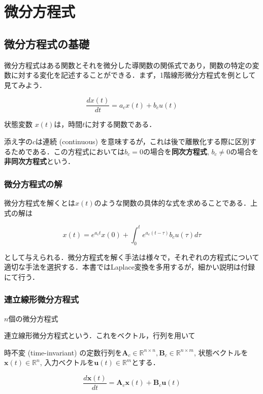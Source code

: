 \section{微分方程式}
\subsection{微分方程式の基礎}
微分方程式はある関数とそれを微分した導関数の関係式であり，関数の特定の変数に対する変化を記述することができる．まず，1階線形微分方程式を例として見てみよう．


\begin{equation}
\frac{dx(t)}{dt}=a_c x(t)+b_c u(t)
\end{equation}


状態変数 $x(t)$は，時間$t$に対する関数である．

添え字の$c$は連続 (continuous) を意味するが，これは後で離散化する際に区別するためである．この方程式においては$b_c=0$の場合を\textbf{同次方程式}, $b_c\neq 0$の場合を\textbf{非同次方程式}という．

\subsubsection{微分方程式の解}
微分方程式を解くとは$x(t)$のような関数の具体的な式を求めることである．上式の解は


\begin{equation}
x(t)=e^{a_c t}x(0)+\int_0^t e^{a_c (t-\tau)}b_c u(\tau) d\tau
\end{equation}


として与えられる．微分方程式を解く手法は様々で，それぞれの方程式について適切な手法を選択する．本書ではLaplace変換を多用するが，細かい説明は付録にて行う．

\subsubsection{連立線形微分方程式}
$n$個の微分方程式

連立線形微分方程式という．これをベクトル，行列を用いて

時不変 (time-invariant) の定数行列を$\mathbf{A}_c \in \mathbb{R}^{n\times n}, \mathbf{B}_c \in \mathbb{R}^{n\times m}$, 状態ベクトルを$\mathbf{x}(t)\in\mathbb{R}^n$, 入力ベクトルを$\mathbf{u}(t)\in\mathbb{R}^m$とする．


\begin{equation}
\frac{d\mathbf{x}(t)}{dt} = \mathbf{A}_c\mathbf{x}(t) + \mathbf{B}_c\mathbf{u}(t)
\end{equation}


